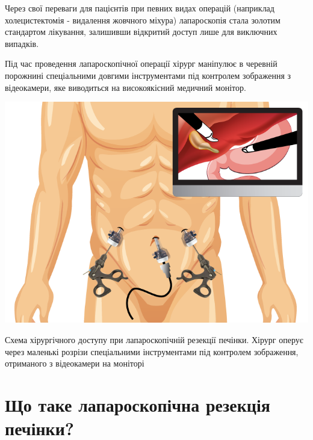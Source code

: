 Через свої переваги для пацієнтів при певних видах операцій (наприклад холецистектомія - видалення жовчного міхура) лапароскопія стала золотим стандартом лікування, залишивши відкритий доступ лише для виключних випадків. 

Під час проведення лапароскопічної операції хірург маніпулює в черевній порожнині спеціальними довгими інструментами під контролем зображення з відеокамери, яке виводиться на високоякісний медичний монітор.


\begin{marginfigure}[40pt]%
  \includegraphics[width=\linewidth]{Figures/LapVsOpen_Laparoscopic surgery.png}
  \caption{Схема хірургічного доступу при лапароскопічній резекції печінки. Хірург оперує через маленькі розрізи спеціальними інструментами під контролем зображення, отриманого з відеокамери на моніторі}
  \label{fig:crlm}
\end{marginfigure}




\section{Що таке лапароскопічна резекція печінки?}

